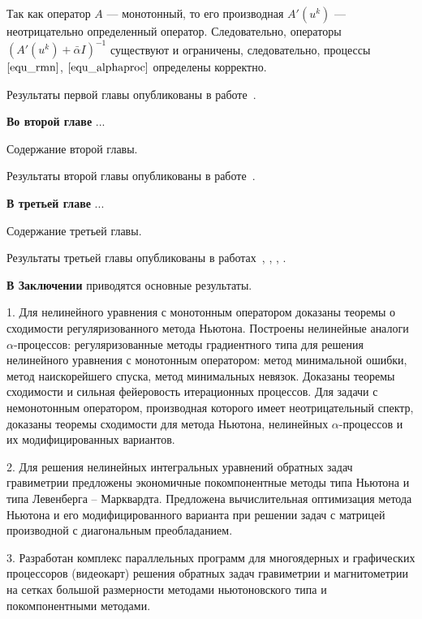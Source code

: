 \documentclass[%
autoref,     %
href,        %
facsimile,   %
colorlinks,  %
]{disser}
\begin{document}
Так как оператор $A$ --- монотонный, то его производная $A'(u^k)$ --- неотрицательно определенный оператор. Следовательно, операторы $(A'(u^k)+\bar\alpha I)^{-1}$ существуют и ограничены, следовательно, процессы $\eqref{equ_rmn}$, $\eqref{equ_alphaproc}$ определены корректно.
\scriptsize
\let\thefootnote\relax\let\thefootnote\relax{}

Результаты первой главы опубликованы в работе~\cite{VasSkur2017,}.

\textbf{Во второй главе} ...

Содержание второй главы.

Результаты второй главы опубликованы в работе~\cite{VasSkur2017,VasSkur2015}.

\textbf{В третьей главе} ...

Содержание третьей главы.

Результаты третьей главы опубликованы в работах~\cite{AkSkur2014}, \cite{AkSkur2015}, \cite{AkSkur2016}, \cite{Skur2017_2}.

\textbf{В Заключении} приводятся основные результаты.


1. Для нелинейного уравнения с монотонным оператором доказаны теоремы о сходимости регуляризованного метода Ньютона. 
Построены нелинейные аналоги $\alpha$-процессов:  регуляризованные методы градиентного типа для решения нелинейного уравнения с монотонным оператором: метод минимальной ошибки, метод наискорейшего спуска, метод минимальных невязок. Доказаны теоремы сходимости и сильная фейеровость итерационных процессов. Для задачи с немонотонным оператором, производная которого имеет неотрицательный спектр, доказаны теоремы сходимости для метода  Ньютона, нелинейных $\alpha$-процессов и их модифицированных вариантов.

2. Для решения нелинейных интегральных уравнений обратных задач гравиметрии предложены экономичные покомпонентные методы 
типа Ньютона и типа Левенберга – Марквардта. Предложена вычислительная оптимизация метода 
Ньютона и его модифицированного варианта при решении задач 
с матрицей производной с диагональным преобладанием. 

3. Разработан комплекс параллельных программ для многоядерных и графических процессоров (видеокарт) решения обратных задач гравиметрии и магнитометрии на сетках большой размерности методами ньютоновского типа и покомпонентными методами. 
\end{document}

